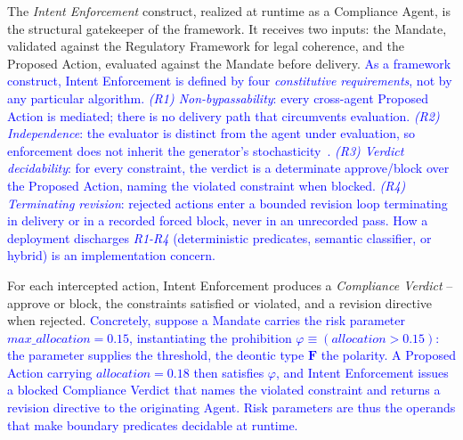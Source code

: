 \documentclass[runningheads]{llncs}
\begin{document}
The \textit{Intent Enforcement} construct, realized at
runtime as a Compliance Agent, is the structural gatekeeper of the framework. It receives two inputs: the Mandate, validated against the Regulatory Framework for legal coherence, and the Proposed Action, evaluated against the Mandate before delivery.
\textcolor{blue}{As a framework construct, Intent Enforcement is defined by four \emph{constitutive requirements}, not by any particular algorithm. \textit{(R1) Non-bypassability}: every cross-agent Proposed Action is mediated; there is no delivery path that circumvents evaluation. \textit{(R2) Independence}: the evaluator is distinct from the agent under evaluation, so enforcement does not inherit the generator's stochasticity~\cite{huang2023selfcorrect}. \textit{(R3) Verdict decidability}: for every constraint, the verdict is a determinate approve/block over the Proposed Action, naming the violated constraint when blocked. \textit{(R4) Terminating revision}: rejected actions enter a bounded revision loop terminating in delivery or in a recorded forced block, never in an unrecorded pass. 
How a deployment discharges \textit{R1-R4} (deterministic predicates, semantic classifier, or hybrid) is an implementation concern.}

\vspace{-1pt}
For each intercepted action, Intent Enforcement produces a
\textit{Compliance Verdict} -- approve or block, the constraints
satisfied or violated, and a revision directive when rejected. 
\textcolor{blue}{Concretely, suppose a Mandate carries the risk parameter $\mathit{max\_allocation}=0.15$, instantiating the prohibition $\varphi \equiv (\mathit{allocation} > 0.15)$: the parameter supplies the threshold, the deontic type $\mathbf{F}$ the polarity. A Proposed Action carrying $\mathit{allocation}=0.18$ then satisfies $\varphi$, and Intent Enforcement issues a blocked Compliance Verdict that names the violated constraint and returns a revision directive to the 
originating Agent. Risk parameters are thus the operands that make boundary predicates decidable at runtime.}

\end{document}
